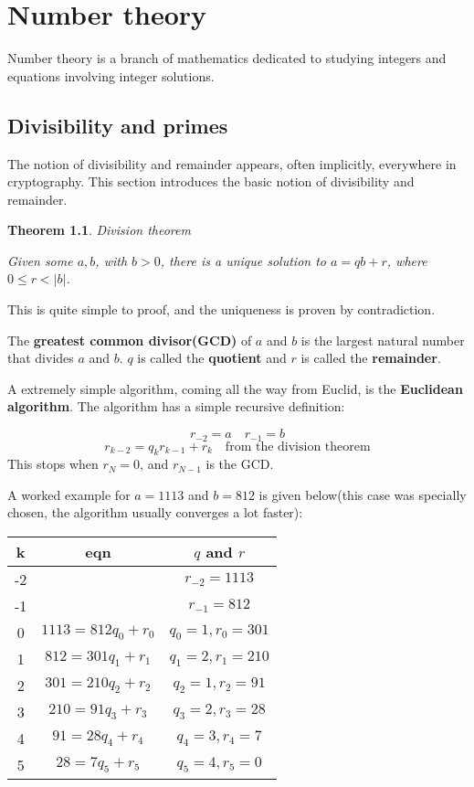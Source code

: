 \documentclass{report}
\newtheorem{theorem}{Theorem}[section]
\begin{document}
\chapter{Number theory}
Number theory is a branch of mathematics dedicated to studying integers and equations involving integer solutions.
\section{Divisibility and primes}
The notion of divisibility and remainder appears, often implicitly, everywhere in cryptography. This section introduces the basic notion of divisibility and remainder.

\begin{theorem}
	Division theorem
	
	Given some $a,b$, with $b>0$, there is a unique solution to $a=qb+r$, where $0\leq r<|b|$.
\end{theorem}
This is quite simple to proof, and the uniqueness is proven by contradiction.

The \textbf{greatest common divisor(GCD)} of $a$ and $b$ is the largest natural number that divides $a$ and $b$. $q$ is called the \textbf{quotient} and $r$ is called the \textbf{remainder}.

A extremely simple algorithm, coming all the way from Euclid, is the \textbf{Euclidean algorithm}. The algorithm has a simple recursive definition:

$$r_{-2}=a\quad r_{-1}=b$$
$$r_{k-2}=q_kr_{k-1}+r_k\quad\text{from the division theorem}$$
This stops when $r_N=0$, and $r_{N-1}$ is the GCD.

A worked example for $a=1113$ and $b=812$ is given below(this case was specially chosen, the algorithm usually converges a lot faster):

\begin{tabular}{|c|c|c|}\hline
	k&eqn&$q$ and $r$\\\hline
	-2&&$r_{-2}=1113$\\\hline
	-1&&$r_{-1}=812$\\\hline
	0&$1113=812q_0+r_0$&$q_0=1,r_0=301$\\\hline
	1&$812=301q_1+r_1$&$q_1=2,r_1=210$\\\hline
	2&$301=210q_2+r_2$&$q_2=1,r_2=91$\\\hline
	3&$210=91q_3+r_3$&$q_3=2,r_3=28$\\\hline
	4&$91=28q_4+r_4$&$q_4=3,r_4=7$\\\hline
	5&$28=7q_5+r_5$&$q_5=4,r_5=0$\\\hline
\end{tabular}
\end{document}
